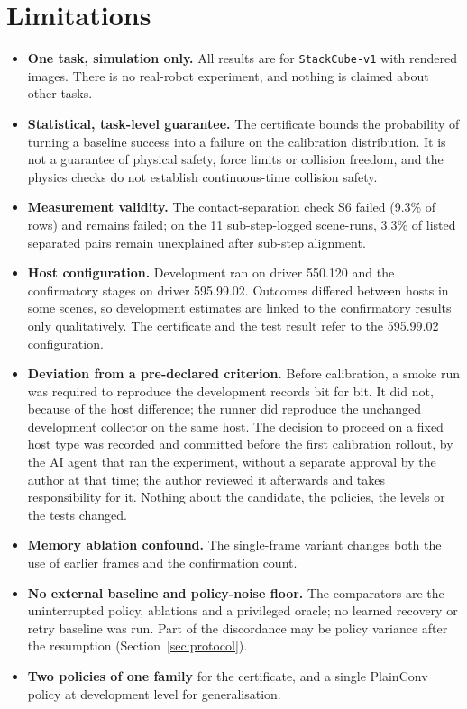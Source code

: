\section{Limitations}\label{sec:limits}

\begin{itemize}
\item \textbf{One task, simulation only.} All results are for \texttt{StackCube-v1} with rendered images. There is no real-robot experiment, and nothing is claimed about other tasks.
\item \textbf{Statistical, task-level guarantee.} The certificate bounds the probability of turning a baseline success into a failure on the calibration distribution. It is not a guarantee of physical safety, force limits or collision freedom, and the physics checks do not establish continuous-time collision safety.
\item \textbf{Measurement validity.} The contact-separation check S6 failed (9.3\% of rows) and remains failed; on the 11 sub-step-logged scene-runs, 3.3\% of listed separated pairs remain unexplained after sub-step alignment.
\item \textbf{Host configuration.} Development ran on driver 550.120 and the confirmatory stages on driver 595.99.02. Outcomes differed between hosts in some scenes, so development estimates are linked to the confirmatory results only qualitatively. The certificate and the test result refer to the 595.99.02 configuration.
\item \textbf{Deviation from a pre-declared criterion.} Before calibration, a smoke run was required to reproduce the development records bit for bit. It did not, because of the host difference; the runner did reproduce the unchanged development collector on the same host. The decision to proceed on a fixed host type was recorded and committed before the first calibration rollout, by the AI agent that ran the experiment, without a separate approval by the author at that time; the author reviewed it afterwards and takes responsibility for it. Nothing about the candidate, the policies, the levels or the tests changed.
\item \textbf{Memory ablation confound.} The single-frame variant changes both the use of earlier frames and the confirmation count.
\item \textbf{No external baseline and policy-noise floor.} The comparators are the uninterrupted policy, ablations and a privileged oracle; no learned recovery or retry baseline was run. Part of the discordance may be policy variance after the resumption (Section~\ref{sec:protocol}).
\item \textbf{Two policies of one family} for the certificate, and a single PlainConv policy at development level for generalisation.
\end{itemize}

